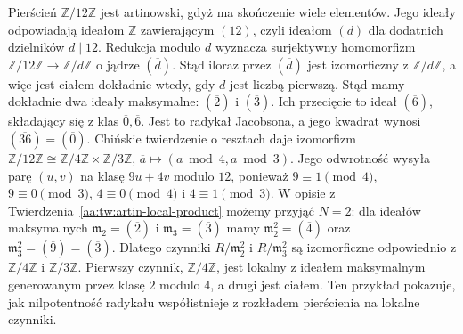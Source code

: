 \begin{przyklad}
\label{aa:prz:artin-z12}
Pierścień $\mathbb Z/12\mathbb Z$ jest artinowski,
gdyż ma skończenie wiele elementów. Jego ideały
odpowiadają ideałom $\mathbb Z$ zawierającym $(12)$,
czyli ideałom $(d)$ dla dodatnich dzielników $d\mid12$.
Redukcja modulo $d$ wyznacza surjektywny homomorfizm
$\mathbb Z/12\mathbb Z\to\mathbb Z/d\mathbb Z$
o jądrze $(\overline d)$. Stąd iloraz przez
$(\overline d)$ jest izomorficzny z
$\mathbb Z/d\mathbb Z$, a więc jest ciałem dokładnie
wtedy, gdy $d$ jest liczbą pierwszą. Stąd mamy dokładnie
dwa ideały maksymalne: $(\overline2)$ i $(\overline3)$.
Ich przecięcie to ideał $(\overline6)$, składający
się z klas $\overline0,\overline6$.
Jest to radykał Jacobsona, a jego kwadrat wynosi
$(\overline{36})=(\overline0)$. Chińskie twierdzenie o resztach daje izomorfizm
$\mathbb Z/12\mathbb Z\cong
\mathbb Z/4\mathbb Z\times\mathbb Z/3\mathbb Z$,
$\overline a\mapsto(a\bmod4,a\bmod3)$.
Jego odwrotność wysyła parę $(u,v)$ na klasę
$9u+4v$ modulo $12$, ponieważ $9\equiv1\pmod4$,
$9\equiv0\pmod3$, $4\equiv0\pmod4$ i
$4\equiv1\pmod3$.
W opisie z Twierdzenia~\ref{aa:tw:artin-local-product}
możemy przyjąć $N=2$: dla ideałów maksymalnych
$\mathfrak m_2=(\overline2)$ i $\mathfrak m_3=(\overline3)$
mamy $\mathfrak m_2^2=(\overline4)$ oraz
$\mathfrak m_3^2=(\overline9)=(\overline3)$.
Dlatego czynniki $R/\mathfrak m_2^2$ i
$R/\mathfrak m_3^2$ są izomorficzne odpowiednio
z $\mathbb Z/4\mathbb Z$ i $\mathbb Z/3\mathbb Z$.
Pierwszy czynnik, $\mathbb Z/4\mathbb Z$, jest lokalny
z ideałem maksymalnym generowanym przez klasę $2$
modulo $4$, a drugi jest ciałem.
Ten przykład pokazuje, jak nilpotentność radykału
współistnieje z rozkładem pierścienia na lokalne czynniki.
\end{przyklad}


